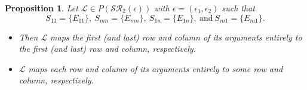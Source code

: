 \documentclass[11pt,reqno]{amsart}
\theoremstyle{plain}
\newtheorem{prop}[theorem]{Proposition}
\theoremstyle{definition}
\numberwithin{equation}{section}
\begin{document}
\begin{prop} \label{SR_epsilon_FirstLast_Row_Col}
	Let $\mathcal{L}\in P(\mathcal{SR}_2(\epsilon))$ with $\epsilon=(\epsilon_1,\epsilon_2)$ such that
	\begin{equation}\label{SR_epsilon_S11SnnSn1S1n_wlog}
		S_{11}=\{E_{11}\},~ S_{mn}=\{E_{mn}\}, ~ S_{1n}=\{E_{1n}\}, ~ \text{and} ~ S_{m1}=\{E_{m1}\}.
	\end{equation}
	\begin{itemize}
		\item [(i)] Then $\mathcal{L}$ maps the first (and last) row and column of its arguments entirely to the first (and last) row and column, respectively.
		
		\item [(ii)] $\mathcal{L}$ maps each row and column of its arguments entirely to some row and column, respectively.
	\end{itemize} 
\end{prop}
\end{document}
